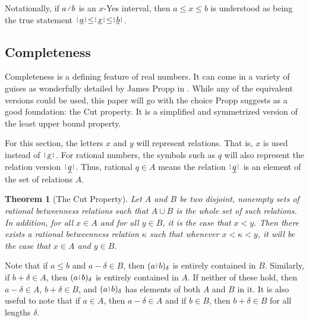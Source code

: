 \documentclass[12pt]{article}
\newtheorem{theorem}{Theorem}[section]
\begin{document}
Notationally, if $a \lte b$ is an $x$-Yes interval, then $a \leq x \leq b$ is understood as being the true statement $\xrel[a] \leq \xrel \leq \xrel[b]$. 


\subsection{Completeness}

Completeness is a defining feature of real numbers. It can come in a variety of guises as wonderfully detailed by James Propp in \cite{propp}. While any of the equivalent versions could be used, this paper will go with the choice Propp suggests as a good foundation:  the Cut property. It is a simplified and symmetrized version of the least upper bound property. 

For this section, the letters $x$ and $y$ will represent relations. That is, $x$ is used instead of $\xrel$. For rational numbers, the symbols such as $q$ will also represent the relation version $\xrel[q]$. Thus, rational $q \in A$ means the relation $\xrel[q]$ is an element of the set of relations $A$. 

\begin{theorem}[The Cut Property] 
Let $A$ and $B$ be two disjoint, nonempty sets of rational betweenness relations such that $A \cup B$ is the whole set of such relations. In addition, for all $x \in A$ and for all $y \in B$, it is the case that $x < y$. Then there exists a rational betweenness relation $\kappa$ such that whenever $x < \kappa < y$, it will be the case that $ x \in A$ and $y \in B$.
\end{theorem}

Note that if $a \leq b$ and $a-\delta \in B$, then $\halo{a\rint b}$ is entirely contained in $B$. Similarly, if $b + \delta \in A$, then $\halo{a\rint b}$ is entirely contained in $A$. If neither of these hold, then $a-\delta \in A$, $b+\delta \in B$, and $\halo{a\rint b}$ has elements of both $A$ and $B$ in it. It is also useful to note that if $a \in A$, then $a-\delta \in A$ and if $b \in B$, then $b+\delta \in B$ for all lengths $\delta$.
\end{document}
